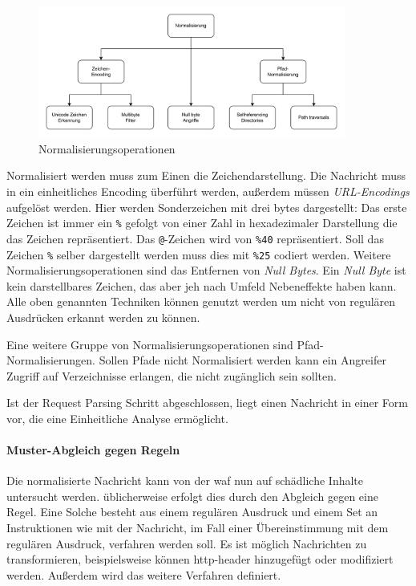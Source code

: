 \begin{figure}[!hbt]
    \centering
    \includegraphics[width=0.9\textwidth]{./images/Normalisierung.png}
    \caption{Normalisierungsoperationen}
    \label{fig:norming}
\end{figure}

Normalisiert werden muss zum Einen die Zeichendarstellung.
Die Nachricht muss in ein einheitliches Encoding überführt werden, außerdem müssen \textit{URL-Encodings} aufgelöst werden.
Hier werden Sonderzeichen mit drei bytes dargestellt:
Das erste Zeichen ist immer ein \verb|%| gefolgt von einer Zahl in hexadezimaler Darstellung die das Zeichen repräsentiert.
Das \verb|@|-Zeichen wird von \verb|%40| repräsentiert.
Soll das Zeichen \verb|%| selber dargestellt werden muss dies mit \verb|%25| codiert werden.
Weitere Normalisierungsoperationen sind das Entfernen von \textit{Null Bytes}.
Ein \textit{Null Byte} ist kein darstellbares Zeichen, das aber jeh nach Umfeld Nebeneffekte haben kann.
Alle oben genannten Techniken können genutzt werden um nicht von regulären Ausdrücken erkannt werden zu können.

Eine weitere Gruppe von Normalisierungsoperationen sind Pfad-Normalisierungen.
Sollen Pfade nicht Normalisiert werden kann ein Angreifer Zugriff auf Verzeichnisse erlangen, die nicht zugänglich sein sollten.

Ist der Request Parsing Schritt abgeschlossen, liegt einen Nachricht in einer Form vor, die eine Einheitliche Analyse ermöglicht.

\paragraph{Muster-Abgleich gegen Regeln}
Die normalisierte Nachricht kann von der \ac{waf} nun auf schädliche Inhalte untersucht werden.
üblicherweise erfolgt dies durch den Abgleich gegen eine Regel.
Eine Solche besteht aus einem regulären Ausdruck und einem Set an Instruktionen wie mit der Nachricht, im Fall einer Übereinstimmung mit dem regulären Ausdruck, verfahren werden soll.
Es ist möglich Nachrichten zu transformieren, beispielsweise können \ac{http}-header hinzugefügt oder modifiziert werden.
Außerdem wird das weitere Verfahren definiert.

